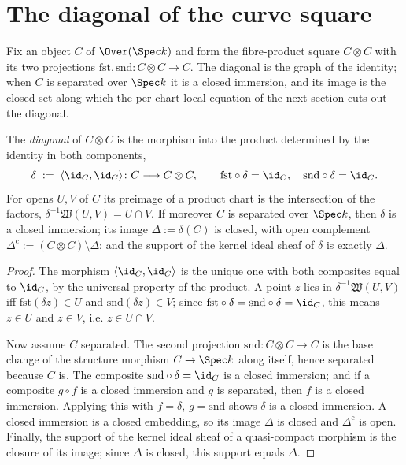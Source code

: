 \section{The diagonal of the curve square}

Fix an object \(C\) of \(\Over(\Spec k)\) and form the fibre-product square \(C \otimes C\) with
its two projections \(\mathrm{fst}, \mathrm{snd} \colon C \otimes C \to C\). The diagonal is the
graph of the identity; when \(C\) is separated over \(\Spec k\) it is a closed immersion, and its
image is the closed set along which the per-chart local equation of the next section cuts out the
diagonal.

\begin{definition}
  \label{def:diagonal}
  \leanok
  The \emph{diagonal} of \(C \otimes C\) is the morphism into the product determined by the
  identity in both components,
  \[
    \delta \;:=\; \langle \id_C, \id_C \rangle \colon C \longrightarrow C \otimes C, \qquad
    \mathrm{fst} \circ \delta = \id_C, \quad \mathrm{snd} \circ \delta = \id_C .
  \]
  For opens \(U, V\) of \(C\) its preimage of a product chart is the intersection of the factors,
  \(\delta^{-1}\mathfrak W(U,V) = U \cap V\). If moreover \(C\) is separated over \(\Spec k\),
  then \(\delta\) is a closed immersion; its image \(\Delta := \delta(C)\) is closed, with open
  complement \(\Delta^{\mathrm{c}} := (C \otimes C) \setminus \Delta\); and the support of the
  kernel ideal sheaf of \(\delta\) is exactly \(\Delta\).
\end{definition}
\begin{proof}
  \leanok
  The morphism \(\langle \id_C, \id_C\rangle\) is the unique one with both composites equal to
  \(\id_C\), by the universal property of the product. A point \(z\) lies in
  \(\delta^{-1}\mathfrak W(U,V)\) iff \(\mathrm{fst}(\delta z) \in U\) and
  \(\mathrm{snd}(\delta z) \in V\); since \(\mathrm{fst} \circ \delta = \mathrm{snd} \circ \delta = \id_C\),
  this means \(z \in U\) and \(z \in V\), i.e. \(z \in U \cap V\).

  Now assume \(C\) separated. The second projection \(\mathrm{snd} \colon C \otimes C \to C\) is
  the base change of the structure morphism \(C \to \Spec k\) along itself, hence separated
  because \(C\) is. The composite \(\mathrm{snd} \circ \delta = \id_C\) is a closed immersion; and
  if a composite \(g \circ f\) is a closed immersion and \(g\) is separated, then \(f\) is a
  closed immersion. Applying this with \(f = \delta\), \(g = \mathrm{snd}\) shows \(\delta\) is a
  closed immersion. A closed immersion is a closed embedding, so its image \(\Delta\) is closed
  and \(\Delta^{\mathrm{c}}\) is open. Finally, the support of the kernel ideal sheaf of a
  quasi-compact morphism is the closure of its image; since \(\Delta\) is closed, this support
  equals \(\Delta\).
\end{proof}


